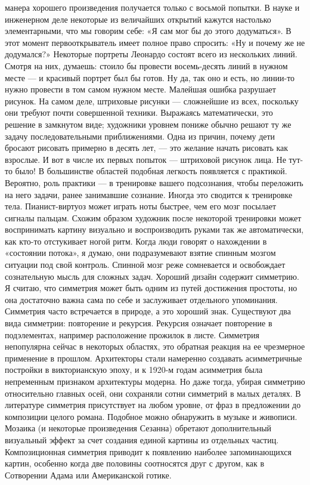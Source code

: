 \documentclass[ebook,12pt,oneside,openany]{memoir}
\begin{document}
манера хорошего произведения получается только с восьмой попытки. В
науке и инженерном деле некоторые из величайших открытий кажутся
настолько элементарными, что мы говорим себе: «Я сам мог бы до этого
додуматься». В этот момент первооткрыватель имеет полное право
спросить: «Ну и почему же не додумался?» Некоторые портреты Леонардо
состоят всего из нескольких линий. Смотря на них, думаешь: стоило бы
провести восемь-десять линий в нужном месте — и красивый портрет был
бы готов. Ну да, так оно и есть, но линии-то нужно провести в том
самом нужном месте. Малейшая ошибка разрушает рисунок. На самом деле,
штриховые рисунки — сложнейшие из всех, поскольку они требуют почти
совершенной техники. Выражаясь математически, это решение в замкнутом
виде; художники уровнем пониже обычно решают ту же задачу
последовательными приближениями. Одна из причин, почему дети бросают
рисовать примерно в десять лет, — это желание начать рисовать как
взрослые. И вот в числе их первых попыток — штриховой рисунок лица. Не
тут-то было! В большинстве областей подобная легкость появляется с
практикой. Вероятно, роль практики — в тренировке вашего подсознания,
чтобы переложить на него задачи, ранее занимавшие сознание. Иногда это
сводится к тренировке тела. Пианист-виртуоз может играть ноты быстрее,
чем его мозг посылает сигналы пальцам. Схожим образом художник после
некоторой тренировки может воспринимать картину визуально и
воспроизводить руками так же автоматически, как кто-то отстукивает
ногой ритм. Когда люди говорят о нахождении в «состоянии потока», я
думаю, они подразумевают взятие спинным мозгом ситуации под свой
контроль. Спинной мозг реже сомневается и освобождает сознательную
мысль для сложных задач. Хороший дизайн содержит симметрию. Я считаю,
что симметрия может быть одним из путей достижения простоты, но она
достаточно важна сама по себе и заслуживает отдельного упоминания.
Симметрия часто встречается в природе, а это хороший знак. Существуют
два вида симметрии: повторение и рекурсия. Рекурсия означает
повторение в подэлементах, например расположение прожилок в листе.
Симметрия непопулярна сейчас в некоторых областях, это обратная
реакция на ее чрезмерное применение в прошлом. Архитекторы стали
намеренно создавать асимметричные постройки в викторианскую эпоху, и к
1920-м годам асимметрия была непременным признаком архитектуры
модерна. Но даже тогда, убирая симметрию относительно главных осей,
они сохраняли сотни симметрий в малых деталях. В литературе симметрия
присутствует на любом уровне, от фраз в предложении до композиции
целого романа. Подобное можно обнаружить в музыке и живописи. Мозаика
(и некоторые произведения Сезанна) обретают дополнительный визуальный
эффект за счет создания единой картины из отдельных частиц.
Композиционная симметрия приводит к появлению наиболее запоминающихся
картин, особенно когда две половины соотносятся друг с другом, как в
Сотворении Адама или Американской готике.
\end{document}
